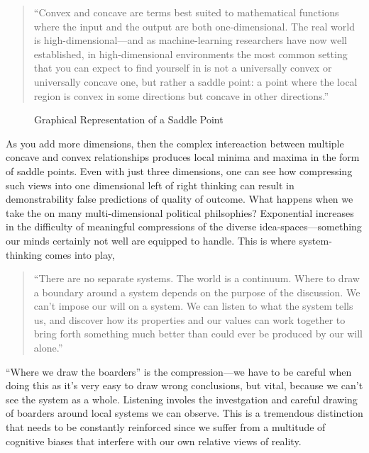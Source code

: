 \documentclass[12pt,a4paper]{article}
\begin{document}
\begin{quotation}
   \color{G-Moon}
   \noindent ``Convex and concave are terms best suited to mathematical functions where the input and the output are both one-dimensional. The real world is high-dimensional---and as machine-learning researchers have now well established, in high-dimensional environments the most common setting that you can expect to find yourself in is not a universally convex or universally concave one, but rather a saddle point: a point where the local region is convex in some directions but concave in other directions.''~\cite{vitalik}
\end{quotation}

\begin{figure}[ht]
   \centering
   \caption*{Graphical Representation of a Saddle Point}
\end{figure}

As you add more dimensions, then the complex intereaction between multiple concave and convex relationships produces local minima and maxima in the form of saddle points. Even with just three dimensions, one can see how compressing such views into one dimensional left of right thinking can result in demonstrability false predictions of quality of outcome. What happens when we take the on many multi-dimensional political philsophies? Exponential increases in the difficulty of meaningful compressions of the diverse idea-spaces---something our minds certainly not well are equipped to handle. This is where system-thinking comes into play,

\begin{quotation}
   \color{G-Moon}
   \noindent``There are no separate systems. The world is a continuum. Where to draw a boundary around a system depends on the purpose of the discussion. We can't impose our will on a system. We can listen to what the system tells us, and discover how its properties and our values can work together to bring forth something much better than could ever be produced by our will alone.''~\cite{systems}
\end{quotation}

``Where we draw the boarders'' is the compression---we have to be careful when doing this as it's very easy to draw wrong conclusions, but vital, because we can't see the system as a whole. Listening involes the investgation and careful drawing of boarders around local systems we can observe. This is a tremendous distinction that needs to be constantly reinforced since we suffer from a multitude of cognitive biases that interfere with our own relative views of reality. 
\end{document}
